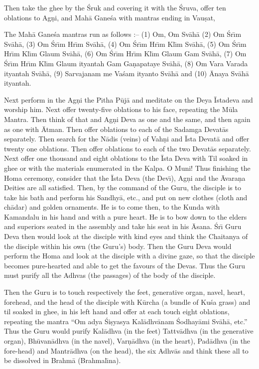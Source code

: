 Then take the ghee by the \'Sruk and covering it with the \'Sruva, offer ten oblations to Ag\d{n}i, and Mah\=a Gane\'sa with mantras ending in Vau\d{s}at,

The Mah\=a Gane\'sa mantras run as follows :-- (1) Om, Om Sv\=ah\=a (2) Om \'Sr\={\i}m Sv\=ah\=a, (3) Om \'Sr\={\i}m Hr\={\i}m Sv\=ah\=a, (4) Om \'Sr\={\i}m Hr\={\i}m Kl\={\i}m Sv\=ah\=a, (5) Om \'Sr\={\i}m Hr\={\i}m Kl\={\i}m Glaum Sv\=ah\=a, (6) Om \'Sr\={\i}m Hr\={\i}m Kl\={\i}m Glaum Gam Sv\=ah\=a, (7) Om \'Sr\={\i}m Hr\={\i}m Kl\={\i}m Glaum ityantah Gam Ga\d{n}apataye Sv\=ah\=a, (8) Om Vara Varada ityantah Sv\=ah\=a, (9) Sarvajanam me Va\'sam ityanto Sv\=ah\=a and (10) \=Anaya Sv\=ah\=a ityantah.

Next perform in the Ag\d{n}i the P\={\i}tha P\=uj\=a and meditate on the Deya \=Istadeva and worship him. Next offer twenty-five oblations to his face, repeating the M\=ula Mantra. Then think of that and Ag\d{n}i Deva as one and the same, and then again as one with \=Atman. Then offer oblations to each of the Sadamga Devat\=as separately. Then search for the N\=adis (veins) of Vah\d{n}i and \=Ista Devat\=a and offer twenty one oblations. Then offer oblations to each of the two Devat\=as separately. Next offer one thousand and eight oblations to the \=Ista Deva with Til soaked in ghee or with the materials enumerated in the Kalpa. O Muni! Thus finishing the Homa ceremony, consider that the \=Ista Deva (the Dev\={\i}), Ag\d{n}i and the \=Avara\d{n}a Deities are all satisfied. Then, by the command of the Guru, the disciple is to take his bath and perform his Sandhy\=a, etc., and put on new clothes (cloth and ch\=adar) and golden ornaments. He is to come then, to the Kunda with Kamandalu in his hand and with a pure heart. He is to bow down to the elders and superiors seated in the assembly and take his seat in his \=Asana. \'Sr\={\i} Guru Deva then would look at the disciple with kind eyes and think the Chaitanya of the disciple within his own (the Guru's) body. Then the Guru Deva would perform the Homa and look at the disciple with a divine gaze, so that the disciple becomes pure-hearted and able to get the favours of the Devas. Thus the Guru must purify all the Adhvas (the passages) of the body of the disciple.

Then the Guru is to touch respectively the feet, generative organ, navel, heart, forehead, and the head of the disciple with K\=urcha (a bundle of Ku\'sa grass) and til soaked in ghee, in his left hand and offer at each touch eight oblations, repeating the mantra ``Om adya \'Si\d{s}yasya Kal\=adhv\=anam \'Sodhay\=ami Sv\=ah\=a, etc.'' Thus the Guru would purify Kal\=adhva (in the feet) Tattv\=adhva (in the generative organ), Bh\=uvan\=adhva (in the navel), Var\d{n}\=adhva (in the heart), Pad\=adhva (in the fore-head) and Mantr\=adhva (on the head), the six Adhv\=as and think these all to be dissolved in Brahm\=a (Brahmal\={\i}na).

